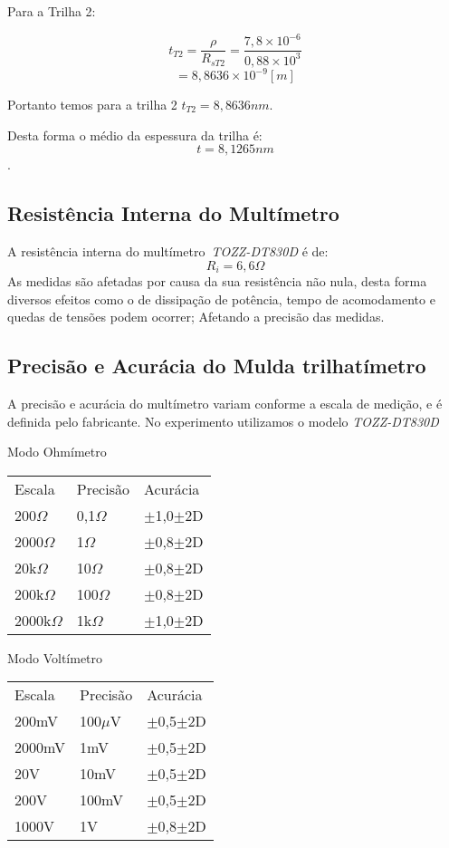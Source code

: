 Para a Trilha 2:

$$t_{T2} = \frac{\rho}{R_{sT2}}=\frac{7,8\times10^{-6}}{0,88\times10^3}  $$
$$=8,8636\times10^{-9}[m]$$


Portanto temos para a trilha 2 \quad  $t_{T2}=8,8636nm$.

Desta forma o médio da espessura da trilha é:
$$t=8,1265nm$$.

\subsection{Resistência Interna do Multímetro}
A resistência interna do multímetro\, \textit{TOZZ-DT830D} é de: $$R_i=6,6\Omega$$
As medidas são afetadas por causa da sua resistência não nula, desta forma diversos efeitos como o de dissipação de potência, tempo de acomodamento e quedas de tensões podem ocorrer; Afetando a precisão das medidas.


\subsection{Precisão e Acurácia do Mulda trilhatímetro}
A precisão e acurácia do multímetro variam conforme a escala de medição, e é definida pelo fabricante.
No experimento utilizamos o modelo \textit{TOZZ-DT830D}


Modo Ohmímetro
\begin{center}
\begin{tabular}{lll}
Escala & Precisão & Acurácia\\
200$\Omega$ & 0,1$\Omega$ &  $\pm$1,0$\pm$2D\\
2000$\Omega$ & 1$\Omega$ &  $\pm$0,8$\pm$2D\\
20k$\Omega$ & 10$\Omega$ &  $\pm$0,8$\pm$2D\\
200k$\Omega$ & 100$\Omega$ &  $\pm$0,8$\pm$2D\\
2000k$\Omega$ & 1k$\Omega$ &  $\pm$1,0$\pm$2D\\
\end{tabular}
\end{center}

Modo Voltímetro
\begin{center}
\begin{tabular}{lll}
Escala & Precisão & Acurácia\\
200mV & 100$\mu$V &  $\pm$0,5$\pm$2D\\
2000mV & 1mV &  $\pm$0,5$\pm$2D\\
20V & 10mV &  $\pm$0,5$\pm$2D\\
200V & 100mV &  $\pm$0,5$\pm$2D\\
1000V & 1V &  $\pm$0,8$\pm$2D\\
\end{tabular}
\end{center}
